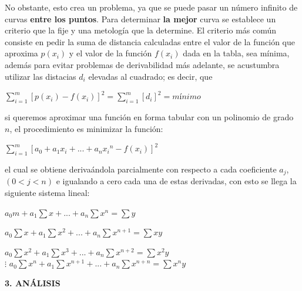 \documentclass[10pt,a4paper]{article}
\begin{document}
\begin{multicols}{2}
		No obstante, esto crea un problema, ya que se puede pasar un número infinito de curvas \textbf{entre los puntos}. Para determinar \textbf{la mejor} curva se establece un criterio que la fije y una metología que la determine. El criterio más común  consiste en pedir la suma de distancia calculadas entre el valor de la función que aproxima $p(x_i)$ y el valor de la función $f(x_i)$ dada en la tabla, sea mínima, además para evitar problemas de derivabilidad más adelante, se acustumbra utilizar las distacias $d_i$ elevadas al cuadrado; es decir, que
		
		\begin{center}
				$\displaystyle\sum_{i=1}^m {[p(x_i) - f(x_i)]}^2 = \displaystyle\sum_{i=1}^m {[d_i]}^2 = mínimo$
		\end{center} 
		
		si queremos aproximar una función en forma tabular con un polinomio de grado $n$, el procedimiento es minimizar la función:
		\begin{center}
			$ \displaystyle\sum_{i=1}^m {[a_0 + a_1x_i + ... + a_n{x_i}^n - f(x_i)]}^2 $
		\end{center}
		el cual se obtiene derivaándola parcialmente con respecto a cada coeficiente $a_j$, $(0<j<n)$ e igualando a cero cada una de estas derivadas, con esto se llega la siguiente sistema lineal:
		
		\begin{center}
			$a_0 m + a_1\displaystyle\sum x + ... + a_n \displaystyle\sum x^n = \displaystyle\sum y$
			
			$a_0 \displaystyle\sum x + a_1\displaystyle\sum x^2 + ... + a_n \displaystyle\sum x^{n+1} = \displaystyle\sum xy$
			
			$a_0 \displaystyle\sum x^2 + a_1\displaystyle\sum x^3 + ... + a_n \displaystyle\sum x^{n+2} = \displaystyle\sum x^2y$\\
			$\vdots$
			$a_0 \displaystyle\sum x^n + a_1\displaystyle\sum x^{n+1} + ... + a_n \displaystyle\sum x^{n+n} = \displaystyle\sum x^ny$
			
			
			
		\end{center}
		
		\vspace*{0.2cm}
		
		\begin{center}
			{\large \bf 3. ANÁLISIS}
		\end{center}
		
		\vspace*{0.2cm}
		

\end{multicols}
\end{document}
